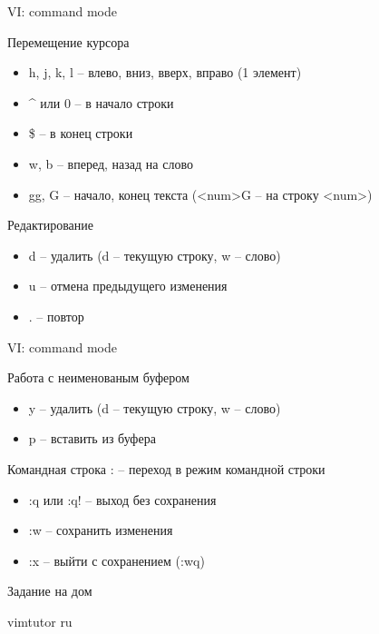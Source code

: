 \begin{frame}{VI: command mode}

	\begin{block}{Перемещение курсора}
		\begin{itemize}
			\item h, j, k, l -- влево, вниз, вверх, вправо (1 элемент)
			\item \^{} или 0 -- в начало строки
			\item \$ -- в конец строки
			\item w, b -- вперед, назад на слово
			\item gg, G -- начало, конец текста (<num>G -- на строку <num>)
		\end{itemize}
	\end{block}

	\begin{block}{Редактирование}
		\begin{itemize}
			\item d -- удалить (d -- текущую строку, w -- слово)
			\item u -- отмена предыдущего изменения
			\item . -- повтор
		\end{itemize}
	\end{block}
\end{frame}

\begin{frame}{VI: command mode}

	\begin{block}{Работа с неименованым буфером}
		\begin{itemize}
			\item y -- удалить (d -- текущую строку, w -- слово)
			\item p -- вставить из буфера
		\end{itemize}
	\end{block}

	\begin{block}{Командная строка}
		: -- переход в режим командной строки
		\begin{itemize}
			\item :q или :q! -- выход без сохранения
			\item :w -- сохранить изменения
			\item :x -- выйти с сохранением (:wq)
		\end{itemize}
	\end{block}
\end{frame}

\begin{frame}{Задание на дом}
\begin{block}{}
vimtutor ru
\end{block}
\end{frame}

